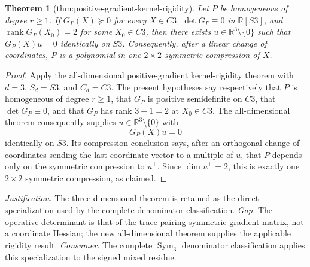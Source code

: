 \documentclass{article}
\newtheorem{theorem}{Theorem}
\begin{document}
\begin{theorem}[thm:positive-gradient-kernel-rigidity]\label{thm:positive-gradient-kernel-rigidity}
Let \(P\) be homogeneous of degree \(r\geq1\). If \(G_P(X)\succeq0\) for every \(X\in C3\), \(\det G_P\equiv0\) in \(\mathbb R[S3]\), and \(\operatorname{rank}G_P(X_0)=2\) for some \(X_0\in C3\), then there exists \(u\in\mathbb R^3\setminus\{0\}\) such that \(G_P(X)u=0\) identically on \(S3\). Consequently, after a linear change of coordinates, \(P\) is a polynomial in one \(2\times2\) symmetric compression of \(X\).
\end{theorem}
\begin{proof}
Apply the all-dimensional positive-gradient kernel-rigidity theorem with \(d=3\), \(S_d=S3\), and \(C_d=C3\).  The present hypotheses say respectively that \(P\) is homogeneous of degree \(r\geq1\), that \(G_P\) is positive semidefinite on \(C3\), that \(\det G_P\equiv0\), and that \(G_P\) has rank \(3-1=2\) at \(X_0\in C3\).  The all-dimensional theorem consequently supplies \(u\in\mathbb R^3\setminus\{0\}\) with
\[
 G_P(X)u=0
\]
identically on \(S3\).  Its compression conclusion says, after an orthogonal change of coordinates sending the last coordinate vector to a multiple of \(u\), that \(P\) depends only on the symmetric compression to \(u^\perp\).  Since \(\dim u^\perp=2\), this is exactly one \(2\times2\) symmetric compression, as claimed.
\end{proof}
\par\smallskip\noindent \textit{Justification.} The three-dimensional theorem is retained as the direct specialization used by the complete denominator classification. \textit{Gap.} The operative determinant is that of the trace-pairing symmetric-gradient matrix, not a coordinate Hessian; the new all-dimensional theorem supplies the applicable rigidity result. \textit{Consumer.} The complete \(\operatorname{Sym}_3\) denominator classification applies this specialization to the signed mixed residue.
\end{document}

